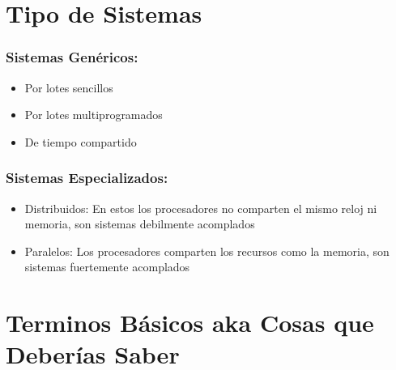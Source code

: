 \documentclass[12pt, fleqn]{report}                             %
\begin{document}
        \clearpage
        \section{Tipo de Sistemas}

            \subsubsection{Sistemas Genéricos:}
            \begin{itemize}
                \item Por lotes sencillos
                \item Por lotes multiprogramados
                \item De tiempo compartido
            \end{itemize}

            \subsubsection{Sistemas Especializados:}
            \begin{itemize}
                \item Distribuidos: En estos los procesadores no comparten el mismo reloj ni memoria,
                son sistemas debilmente acomplados

                \item Paralelos: Los procesadores comparten los recursos como la memoria, son sistemas
                fuertemente acomplados
            \end{itemize}     

        \clearpage
        \section{Terminos Básicos aka Cosas que Deberías Saber}
\end{document}
